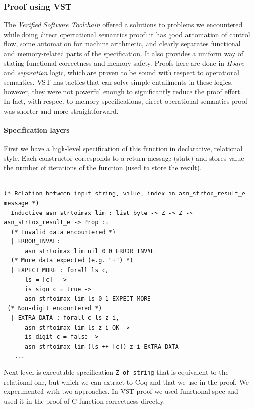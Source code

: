 \documentclass[acmsmall,nonacm]{acmart}
\begin{document}
\subsubsection{Proof using VST}

The \textit{Verified Software Toolchain}\cite{TODO:VST} offered a
solutions to problems we encountered while doing direct opertational
semantics proof: it has good automation of control flow, some
automation for machine arithmetic, and clearly separates functional
and memory-related parts of the specification. It also provides a
uniform way of stating functional correctness and memory
safety. Proofs here are done in \textit{Hoare} and \textit{separation}
logic, which are proven to be sound with respect to operational
semantics. VST has tactics that can solve simple entailments in these
logics, however, they were not powerful enough to significantly reduce
the proof effort. In fact, with respect to memory specifications,
direct operational semantics proof was shorter and more
straightforward.

\paragraph{Specification layers} First we have a high-level specification of this function in declarative, relational style. Each constructor corresponds to a return message (state) and stores value the number of iterations of the function (used to store the result).

 \begin{lstlisting}[language=Coq]

(* Relation between input string, value, index an asn_strtox_result_e message *)
  Inductive asn_strtoimax_lim : list byte -> Z -> Z -> asn_strtox_result_e -> Prop :=
  (* Invalid data encountered *)
  | ERROR_INVAL:
      asn_strtoimax_lim nil 0 0 ERROR_INVAL
  (* More data expected (e.g. "+") *)
  | EXPECT_MORE : forall ls c,
      ls = [c]  ->
      is_sign c = true ->
      asn_strtoimax_lim ls 0 1 EXPECT_MORE
 (* Non-digit encountered *)
  | EXTRA_DATA : forall c ls z i,
      asn_strtoimax_lim ls z i OK ->
      is_digit c = false -> 
      asn_strtoimax_lim (ls ++ [c]) z i EXTRA_DATA
   ...    
  \end{lstlisting}

Next level is executable specification \texttt{Z\_of\_string} that is equivalent to the relational one, but which we can extract to Coq and that we use in the proof. We experimented with two approaches. In VST proof we used functional spec and used it in the proof of C function correctness directly.
\end{document}

